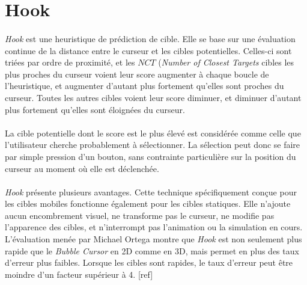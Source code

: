 \section{Hook}
	\paragraph{}
	\emph{Hook} est une heuristique de prédiction de cible. Elle se base sur une évaluation continue de la distance entre le curseur et les cibles potentielles. Celles-ci sont triées par ordre de proximité, et les $NCT$ (\emph{Number of Closest Targets} cibles les plus proches du curseur voient leur score augmenter à chaque boucle de l'heuristique, et augmenter d'autant plus fortement qu'elles sont proches du curseur. Toutes les autres cibles voient leur score diminuer, et diminuer d'autant plus fortement qu'elles sont éloignées du curseur.
		
	\paragraph{}
	La cible potentielle dont le score est le plus élevé est considérée comme celle que l'utilisateur cherche probablement à sélectionner. La sélection peut donc se faire par simple pression d'un bouton, sans contrainte particulière sur la position du curseur au moment où elle est déclenchée.
		
	\paragraph{}
	\emph{Hook} présente plusieurs avantages. Cette technique spécifiquement conçue pour les cibles mobiles fonctionne également pour les cibles statiques. Elle n'ajoute aucun encombrement visuel, ne transforme pas le curseur, ne modifie pas l'apparence des cibles, et n'interrompt pas l'animation ou la simulation en cours. L'évaluation menée par Michael Ortega montre que \emph{Hook} est non seulement plus rapide que le \emph{Bubble Cursor} en 2D comme en 3D, mais permet en plus des taux d'erreur plus faibles. Lorsque les cibles sont rapides, le taux d'erreur peut être moindre d'un facteur supérieur à 4. [ref]

\clearpage
